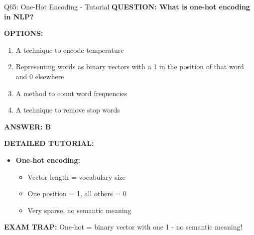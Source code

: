 \documentclass[8pt]{beamer}
\begin{document}
	\begin{frame}{Q65: One-Hot Encoding - Tutorial}
		\fontsize{6.5}{7.5}\selectfont
		\textbf{QUESTION: What is one-hot encoding in NLP?}
		
		\vspace{0.1cm}
		\textbf{OPTIONS:}
		\begin{enumerate}
			\item A technique to encode temperature
			\item Representing words as binary vectors with a 1 in the position of that word and 0 elsewhere
			\item A method to count word frequencies
			\item A technique to remove stop words
		\end{enumerate}
		
		\vspace{0.1cm}
		\textcolor{myblue}{\textbf{ANSWER: B}}
		
		\vspace{0.1cm}
		\textbf{DETAILED TUTORIAL:}
		\begin{itemize}
			\item \textbf{One-hot encoding:}
			\begin{itemize}
				\item Vector length = vocabulary size
				\item One position = 1, all others = 0
				\item Very sparse, no semantic meaning
			\end{itemize}
		\end{itemize}
		
		\textcolor{myred}{\textbf{EXAM TRAP:}} One-hot = \textcolor{myblue}{binary vector with one 1} - no semantic meaning!
	\end{frame}
	
\end{document}
